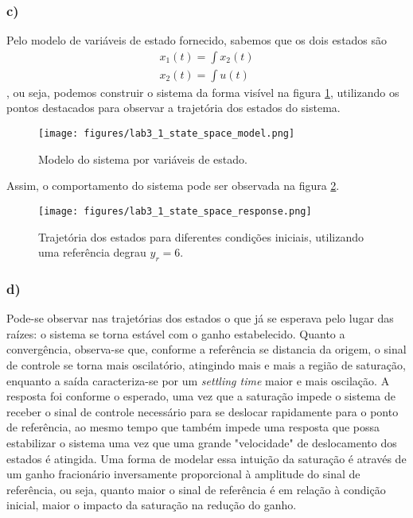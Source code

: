 \documentclass[a4paper]{report}
\begin{document}
\subsubsection*{c)}

Pelo modelo de variáveis de estado fornecido, sabemos que os dois estados são 
\begin{align*}
    x_1(t) = \int x_2(t) \\
    x_2(t) = \int u(t)
\end{align*}
, ou seja, podemos construir o sistema da forma visível na figura \ref{fig:figures-lab3_1_state_space_model-png}, utilizando os pontos destacados para observar a trajetória dos estados do sistema.

\begin{figure}[H]
    \centering
    \texttt{[image: figures/lab3\_1\_state\_space\_model.png]}
    \caption{Modelo do sistema por variáveis de estado.}
    \label{fig:figures-lab3_1_state_space_model-png}
\end{figure}

Assim, o comportamento do sistema pode ser observada na figura \ref{fig:figures-lab3_1_state_space_response-png}.

\begin{figure}[H]
    \centering
    \texttt{[image: figures/lab3\_1\_state\_space\_response.png]}
    \caption{Trajetória dos estados para diferentes condições iniciais, utilizando uma referência degrau $y_r = 6$.}
    \label{fig:figures-lab3_1_state_space_response-png}
\end{figure}

\subsubsection*{d)}

Pode-se observar nas trajetórias dos estados o que já se esperava pelo lugar das raízes: o sistema se torna estável com o ganho estabelecido. Quanto a convergência, observa-se que, conforme a referência se distancia da origem, o sinal de controle se torna mais oscilatório, atingindo mais e mais a região de saturação, enquanto a saída caracteriza-se por um \emph{settling time} maior e mais oscilação. A resposta foi conforme o esperado, uma vez que a saturação impede o sistema de receber o sinal de controle necessário para se deslocar rapidamente para o ponto de referência, ao mesmo tempo que também impede uma resposta que possa estabilizar o sistema uma vez que uma grande "velocidade" de deslocamento dos estados é atingida. Uma forma de modelar essa intuição da saturação é através de um ganho fracionário inversamente proporcional à amplitude do sinal de referência, ou seja, quanto maior o sinal de referência é em relação à condição inicial, maior o impacto da saturação na redução do ganho.
\end{document}
